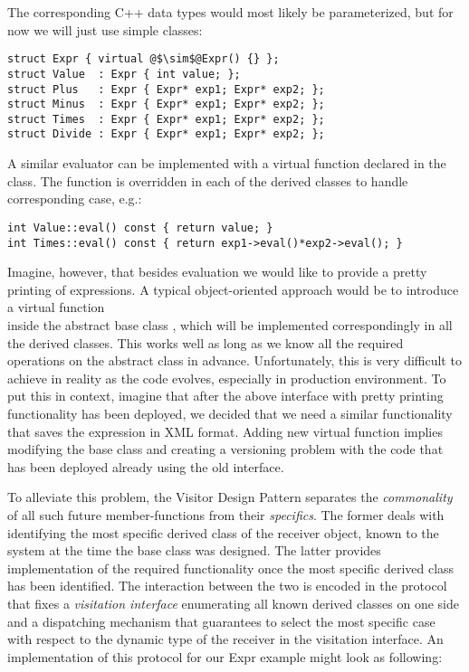 \noindent
The corresponding C++ data types would most likely be parameterized, but for
now we will just use simple classes:

\begin{lstlisting}[keepspaces,columns=flexible]
struct Expr { virtual @$\sim$@Expr() {} };
struct Value  : Expr { int value; };
struct Plus   : Expr { Expr* exp1; Expr* exp2; };
struct Minus  : Expr { Expr* exp1; Expr* exp2; };
struct Times  : Expr { Expr* exp1; Expr* exp2; };
struct Divide : Expr { Expr* exp1; Expr* exp2; };
\end{lstlisting}

\noindent
A similar evaluator can be implemented with a virtual function  declared in the  class. The function is overridden 
in each of the derived classes to handle corresponding case, e.g.:

\begin{lstlisting}[keepspaces,columns=flexible]
int Value::eval() const { return value; }
int Times::eval() const { return exp1->eval()*exp2->eval(); }
\end{lstlisting}

\noindent
Imagine, however, that besides evaluation we would like to provide a pretty 
printing of expressions. A typical object-oriented approach would be to 
introduce a virtual function \\  inside 
the abstract base class , which will be implemented correspondingly 
in all the derived classes. This works well as long as we know all the required  
operations on the abstract class in advance. Unfortunately, this is very 
difficult to achieve in reality as the code evolves, especially in production 
environment. To put this in context, imagine that after the above interface with 
pretty printing functionality has been deployed, we decided that we need a 
similar functionality that saves the expression in XML format. Adding new 
virtual function implies modifying the base class and creating a versioning 
problem with the code that has been deployed already using the old interface.

To alleviate this problem, the Visitor Design Pattern separates the 
\emph{commonality} of all such future member-functions from their 
\emph{specifics}. The former deals with identifying the most specific derived 
class of the receiver object, known to the system at the time the base class was 
designed. The latter provides implementation of the required functionality once 
the most specific derived class has been identified. The interaction between the 
two is encoded in the protocol that fixes a \emph{visitation interface} 
enumerating all known derived classes on one side and a dispatching mechanism 
that guarantees to select the most specific case with respect to the dynamic 
type of the receiver in the visitation interface. An implementation of this 
protocol for our Expr example might look as following:

